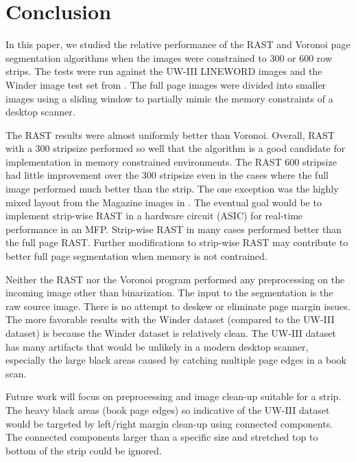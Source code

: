 \documentclass[conference]{IEEEtran}
\begin{document}
\section{Conclusion}

In this paper, we studied the relative performance of the RAST and Voronoi page
segmentation algorithms when the images were constrained to 300 or 600 row
strips. The tests were run against the UW-III LINEWORD images and the Winder 
image test set from \cite{winder2010extending}. The full page images were divided
into smaller images using a sliding window to partially mimic the memory
constraints of a desktop scanner.

The RAST results were almost uniformly better than Voronoi. Overall, RAST with
a 300 stripsize performed so well that the algorithm is a good candidate
for implementation in memory constrained environments. 
The RAST 600
stripsize had little improvement over the 300 stripsize even in the cases where
the full image performed much better than the strip. The one exception was the
highly mixed layout from the Magazine images in \cite{winder2010extending}.
The eventual goal would be to implement strip-wise RAST in a
hardware circuit (ASIC) for real-time performance in an MFP.  
Strip-wise RAST in many cases performed better than the full page RAST. 
Further modifications to strip-wise RAST may contribute to better full page 
segmentation when memory is not contrained.

Neither the RAST nor the Voronoi program performed any preprocessing on the incoming
image other than binarization. The input to the segmentation is the raw source
image. There is no attempt to deskew or eliminate page margin issues. The more
favorable results with the Winder dataset (compared to the UW-III dataset) is
because the Winder dataset is relatively clean. The UW-III dataset has many
artifacts that would be unlikely in a modern desktop scanner, especially the
large black areas caused by catching multiple page edges in a book scan. 


Future work will focus on preprocessing and image clean-up suitable for a
strip. The heavy black areas (book page edges) so indicative of the UW-III
dataset would be targeted by left/right margin clean-up using connected
components. The connected components larger than a specific size and 
stretched top to bottom of the strip could be ignored.
\end{document}

